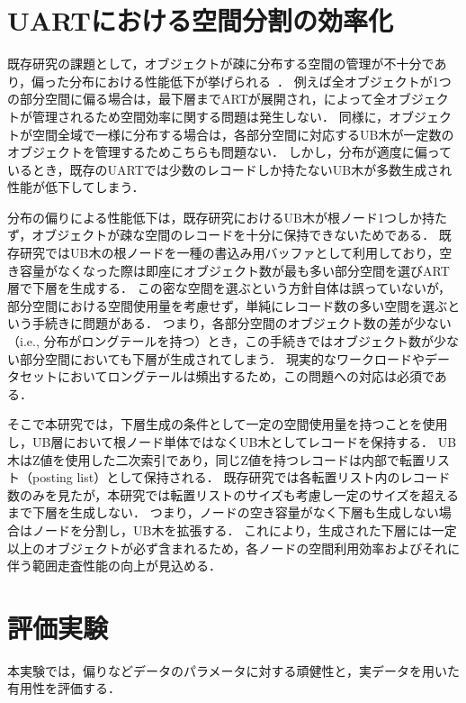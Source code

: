 \chapter{UARTにおける空間分割の効率化}

既存研究の課題として，オブジェクトが疎に分布する空間の管理が不十分であり，偏った分布における性能低下が挙げられる~\cite{deim:Suzuki2023}．
例えば全オブジェクトが1つの部分空間に偏る場合は，最下層までARTが展開され，\BTree{}によって全オブジェクトが管理されるため空間効率に関する問題は発生しない．
同様に，オブジェクトが空間全域で一様に分布する場合は，各部分空間に対応するUB木が一定数のオブジェクトを管理するためこちらも問題ない．
しかし，分布が適度に偏っているとき，既存のUARTでは少数のレコードしか持たないUB木が多数生成され性能が低下してしまう．

分布の偏りによる性能低下は，既存研究におけるUB木が根ノード1つしか持たず，オブジェクトが疎な空間のレコードを十分に保持できないためである．
既存研究ではUB木の根ノードを一種の書込み用バッファとして利用しており，空き容量がなくなった際は即座にオブジェクト数が最も多い部分空間を選びART層で下層を生成する．
この密な空間を選ぶという方針自体は誤っていないが，部分空間における空間使用量を考慮せず，単純にレコード数の多い空間を選ぶという手続きに問題がある．
つまり，各部分空間のオブジェクト数の差が少ない（i.e., 分布がロングテールを持つ）とき，この手続きではオブジェクト数が少ない部分空間においても下層が生成されてしまう．
現実的なワークロードやデータセットにおいてロングテールは頻出するため，この問題への対応は必須である．

そこで本研究では，下層生成の条件として一定の空間使用量を持つことを使用し，UB層において根ノード単体ではなくUB木としてレコードを保持する．
UB木はZ値を使用した二次索引であり，同じZ値を持つレコードは内部で転置リスト（posting list）として保持される．
既存研究では各転置リスト内のレコード数のみを見たが，本研究では転置リストのサイズも考慮し一定のサイズを超えるまで下層を生成しない．
つまり，ノードの空き容量がなく下層も生成しない場合はノードを分割し，UB木を拡張する．
これにより，生成された下層には一定以上のオブジェクトが必ず含まれるため，各ノードの空間利用効率およびそれに伴う範囲走査性能の向上が見込める．





\chapter{評価実験}

本実験では，偏りなどデータのパラメータに対する頑健性と，実データを用いた有用性を評価する．

